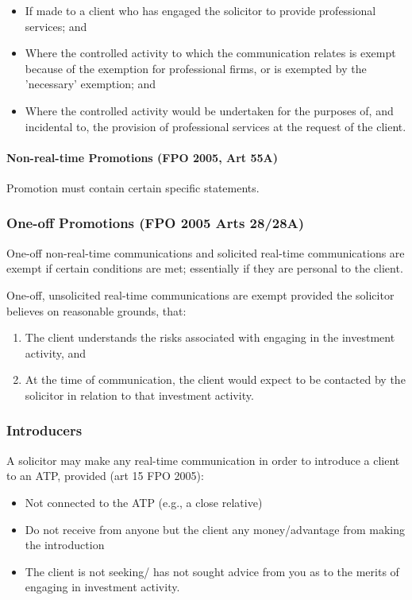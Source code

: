 \documentclass[
]{article}
\providecommand{\tightlist}{%
  \setlength{\itemsep}{0pt}\setlength{\parskip}{0pt}}
\begin{document}
\begin{itemize}
\tightlist
\item
  If made to a client who has engaged the solicitor to provide
  professional services; and
\item
  Where the controlled activity to which the communication relates is
  exempt because of the exemption for professional firms, or is exempted
  by the 'necessary' exemption; and
\item
  Where the controlled activity would be undertaken for the purposes of,
  and incidental to, the provision of professional services at the
  request of the client.
\end{itemize}

\hypertarget{non-real-time-promotions-fpo-2005-art-55a}{%
\paragraph{Non-real-time Promotions (FPO 2005, Art
55A)}\label{non-real-time-promotions-fpo-2005-art-55a}}

Promotion must contain certain specific statements.

\hypertarget{one-off-promotions-fpo-2005-arts-2828a}{%
\subsubsection{One-off Promotions (FPO 2005 Arts
28/28A)}\label{one-off-promotions-fpo-2005-arts-2828a}}

One-off non-real-time communications and solicited real-time
communications are exempt if certain conditions are met; essentially if
they are personal to the client.

One-off, unsolicited real-time communications are exempt provided the
solicitor believes on reasonable grounds, that:

\begin{enumerate}
\tightlist
\item
  The client understands the risks associated with engaging in the
  investment activity, and
\item
  At the time of communication, the client would expect to be contacted
  by the solicitor in relation to that investment activity.
\end{enumerate}

\hypertarget{introducers}{%
\subsubsection{Introducers}\label{introducers}}

A solicitor may make any real-time communication in order to introduce a
client to an ATP, provided (art 15 FPO 2005):

\begin{itemize}
\tightlist
\item
  Not connected to the ATP (e.g., a close relative)
\item
  Do not receive from anyone but the client any money/advantage from
  making the introduction
\item
  The client is not seeking/ has not sought advice from you as to the
  merits of engaging in investment activity.
\end{itemize}
\end{document}
